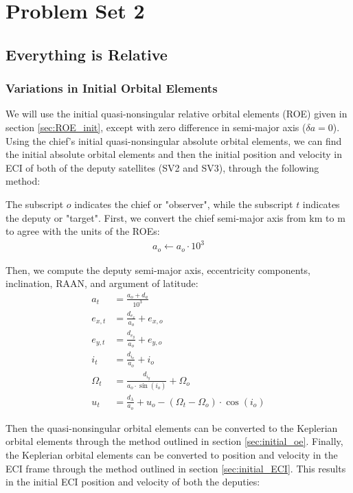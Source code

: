 \section{Problem Set 2}
\subsection{Everything is Relative}

\subsubsection{Variations in Initial Orbital Elements} \label{sec:rel_init_oe}
We will use the initial quasi-nonsingular relative orbital elements (ROE) given in section \ref{sec:ROE_init}, except with zero difference in semi-major axis ($\delta a =0$). Using the chief's initial quasi-nonsingular absolute orbital elements, we can find the initial absolute orbital elements and then the initial position and velocity in ECI of both of the deputy satellites (SV2 and SV3), through the following method: 

The subscript $o$ indicates the chief or "observer", while the subscript $t$ indicates the deputy or "target". First, we convert the chief semi-major axis from km to m to agree with the units of the ROEs:
\begin{align}
   a_o \leftarrow a_o \cdot 10^3 
\end{align}


Then, we compute the deputy semi-major axis, eccentricity components, inclination, RAAN, and argument of latitude:
    \begin{align}
    a_t &= \frac{a_o + d_a}{10^3} \\
    e_{x,t} &= \frac{d_{e_x}}{a_o} + e_{x,o} \\
    e_{y,t} &= \frac{d_{e_y}}{a_o} + e_{y,o} \\
    i_t &= \frac{d_{i_x}}{a_o}  + i_o \\
    \Omega_t &= \frac{d_{i_y}}{a_o \cdot \sin(i_o)}  + \Omega_o \\
    u_t &=  \frac{d_\lambda}{a_o}+ u_o - (\Omega_t - \Omega_o) \cdot \cos(i_o)
\end{align}


Then the quasi-nonsingular orbital elements can be converted to the Keplerian orbital elements through the method outlined in section \ref{sec:initial_oe}. Finally, the Keplerian orbital elements can be converted to position and velocity in the ECI frame through the method outlined in section \ref{sec:initial_ECI}. This results in the initial ECI position and velocity of both the deputies: 

